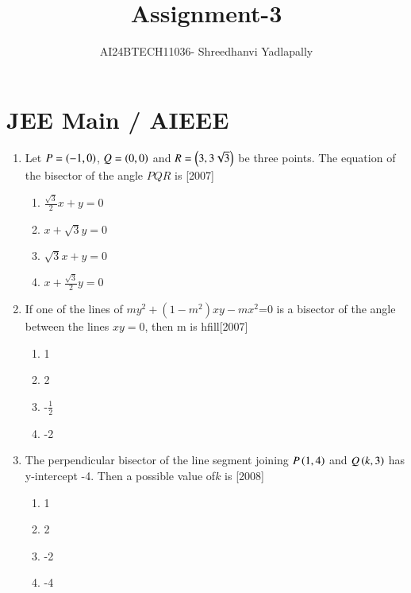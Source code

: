 \documentclass[journal,12pt,twocolumn]{IEEEtran}
\theoremstyle{remark}
\begin{document}
\renewcommand{\thefigure}{\theenumi}
\renewcommand{\thetable}{\theenumi}

\vspace{3cm}

\title{Assignment-3 }
\author{AI24BTECH11036- Shreedhanvi Yadlapally}
\maketitle
\newpage
\bigskip
\section{JEE Main / AIEEE}
\begin{enumerate}
\item Let $P=\left(-1, 0\right)$, $Q=\left(0, 0\right)$ and $R=\left(3, 3\sqrt{3}\right)$ be three points. The equation of the bisector of the angle $PQR$ is \hfill{[2007]}
\begin{multicols}{2}
\begin{enumerate}[label=(\alph*)]
\item $\frac{\sqrt{3}}{2}x+y=0$
\item $x+\sqrt{3}y=0$
\item $\sqrt{3}x+y=0$
\item $x+\frac{\sqrt{3}}{2}y=0$
\end{enumerate}
\end{multicols}

\item If one of the lines of $my^{2}+(1-m^{2})xy-mx^{2}$=0 is a bisector 
of the angle between the lines $xy=0$, then m is hfill{[2007]}
\begin{multicols}{4}
\begin{enumerate}[label=(\alph*)]
\item 1
\item 2
\item -$\frac{1}{2}$
\item -2
\end{enumerate}
\end{multicols}

\item The perpendicular bisector of the line segment joining $P 
\left(1,4\right)$ and $Q\left(k, 3\right)$ has y-intercept -4. Then a possible value of$k$ is \hfill{[2008]}
\begin{multicols}{4}
\begin{enumerate}[label=(\alph*)]
\item 1
\item 2
\item -2
\item -4
\end{enumerate}
\end{multicols} 


\end{enumerate}
\end{document}
